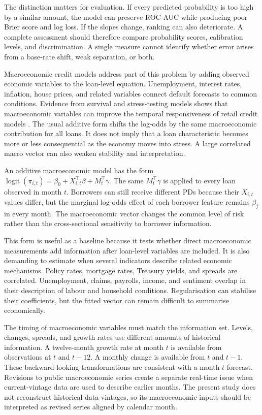 The distinction matters for evaluation. If every predicted probability is too high by a similar amount, the model can preserve ROC-AUC while producing poor Brier score and log loss. If the slopes change, ranking can also deteriorate. A complete assessment should therefore compare probability scores, calibration levels, and discrimination. A single measure cannot identify whether error arises from a base-rate shift, weak separation, or both.

Macroeconomic credit models address part of this problem by adding observed economic variables to the loan-level equation. Unemployment, interest rates, inflation, house prices, and related variables connect default forecasts to common conditions. Evidence from survival and stress-testing models shows that macroeconomic variables can improve the temporal responsiveness of retail credit models \citep{bellotti2009credit,bellotti2013stress}. The usual additive form shifts the log-odds by the same macroeconomic contribution for all loans. It does not imply that a loan characteristic becomes more or less consequential as the economy moves into stress. A large correlated macro vector can also weaken stability and interpretation.

An additive macroeconomic model has the form $\operatorname{logit}(\pi_{i,t})=\beta_0+X_{i,t}^{\top}\beta+M_t^{\top}\gamma$. The same $M_t^{\top}\gamma$ is applied to every loan observed in month $t$. Borrowers can still receive different PDs because their $X_{i,t}$ values differ, but the marginal log-odds effect of each borrower feature remains $\beta_j$ in every month. The macroeconomic vector changes the common level of risk rather than the cross-sectional sensitivity to borrower information.

This form is useful as a baseline because it tests whether direct macroeconomic measurements add information after loan-level variables are included. It is also demanding to estimate when several indicators describe related economic mechanisms. Policy rates, mortgage rates, Treasury yields, and spreads are correlated. Unemployment, claims, payrolls, income, and sentiment overlap in their description of labour and household conditions. Regularisation can stabilise their coefficients, but the fitted vector can remain difficult to summarise economically.

The timing of macroeconomic variables must match the information set. Levels, changes, spreads, and growth rates use different amounts of historical information. A twelve-month growth rate at month $t$ is available from observations at $t$ and $t-12$. A monthly change is available from $t$ and $t-1$. These backward-looking transformations are consistent with a month-$t$ forecast. Revisions to public macroeconomic series create a separate real-time issue when current-vintage data are used to describe earlier months. The present study does not reconstruct historical data vintages, so its macroeconomic inputs should be interpreted as revised series aligned by calendar month.

